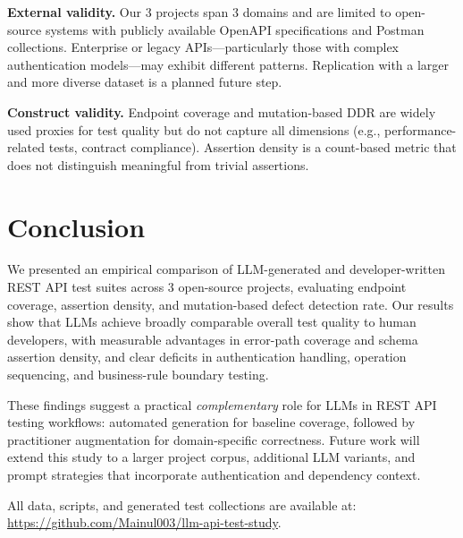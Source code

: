 \documentclass[sigconf,review,anonymous=false]{acmart}
\begin{document}
\textbf{External validity.} Our 3 projects span 3 domains and
are limited to open-source systems with publicly available OpenAPI
specifications and Postman collections. Enterprise or legacy APIs---particularly
those with complex authentication models---may exhibit different patterns.
Replication with a larger and more diverse dataset is a planned future step.

\textbf{Construct validity.} Endpoint coverage and mutation-based DDR are
widely used proxies for test quality but do not capture all dimensions
(e.g., performance-related tests, contract compliance). Assertion density is
a count-based metric that does not distinguish meaningful from trivial
assertions.

\section{Conclusion}\label{sec:conclusion}
We presented an empirical comparison of LLM-generated and developer-written
REST API test suites across 3 open-source projects, evaluating endpoint
coverage, assertion density, and mutation-based defect detection rate. Our
results show that LLMs achieve broadly comparable overall test quality to
human developers, with measurable advantages in error-path coverage and schema
assertion density, and clear deficits in authentication handling, operation
sequencing, and business-rule boundary testing.

These findings suggest a practical \emph{complementary} role for LLMs in
REST API testing workflows: automated generation for baseline coverage,
followed by practitioner augmentation for domain-specific correctness. Future
work will extend this study to a larger project corpus, additional LLM variants,
and prompt strategies that incorporate authentication and dependency context.

All data, scripts, and generated test collections are available at:
\url{https://github.com/Mainul003/llm-api-test-study}.

\end{document}
